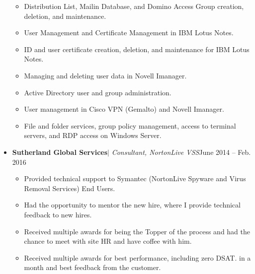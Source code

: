 \documentclass[letterpaper, 12 pt]{article}
\begin{document}
\begin{itemize}[noitemsep]
			\vspace*{-0.6cm}
			\begin{itemize}[noitemsep]
				\item{Distribution List, Mailin Database, and Domino Access Group creation, deletion, and maintenance.}
				\item {User Management and Certificate Management in IBM Lotus Notes.}
				\item {ID and user certificate creation, deletion, and maintenance for IBM Lotus Notes.}
				\item {Managing and deleting user data in Novell Imanager.}
				\item {Active Directory user and group administration.}
				\item {User management in Cisco VPN (Gemalto) and Novell Imanager.}
				\item {File and folder services, group policy management, access to terminal servers, and RDP access on Windows Server.}	
			\end{itemize}
			\vspace*{-0.1cm}
			\item {\textbf{Sutherland Global Services}$|$ \textit{Consultant, NortonLive VSS}\hfill{June 2014 -- Feb. 2016}}\\
			\vspace*{-0.6cm}
			\begin{itemize}[noitemsep]
				\item {Provided technical support to Symantec (NortonLive Spyware and Virus Removal Services) End Users.}
				\item {Had the opportunity to mentor the new hire, where I provide technical feedback to new hires.}
				\item {Received multiple awards for being the Topper of the process and had the chance to meet with site HR and have coffee with him.}
				\item  {Received multiple awards for best performance, including zero DSAT. in a month and best feedback from the customer.}
		\end{itemize}
		
	\end{itemize}
\end{document}
